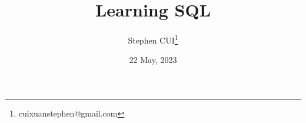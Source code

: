 \documentclass[openany]{book}
\title{Learning SQL}
\author{Stephen CUI\thanks{cuixuanstephen@gmail.com}}
\date{22 May, 2023}
\begin{document}
\maketitle
\frontmatter
\begin{multicols}{2}
    \tableofcontents
\end{multicols}
\mainmatter






\end{document}
